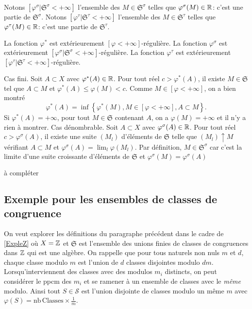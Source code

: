Notons $[\varphi^\sigma|\mathfrak{S}^{\sigma} < +\infty]$ l'ensemble des $M \in \mathfrak{S}^{\sigma}$ telles que $\varphi^\sigma(M) \in \mathbb{R}$: c'est une partie de $\mathfrak{S}^{\sigma}$.\newline
Notons $[\varphi^\tau|\mathfrak{S}^{\tau} < +\infty]$ l'ensemble des $M \in \mathfrak{S}^{\tau}$ telles que $\varphi^\tau(M) \in \mathbb{R}$: c'est une partie de $\mathfrak{S}^{\tau}$.
\begin{prop}
 La fonction $\varphi^*$ est extérieurement $[\varphi < +\infty]$-régulière.\newline
 La fonction $\varphi^\sigma$ est extérieurement $[\varphi^\sigma|\mathfrak{S}^{\sigma} < +\infty]$-régulière.\newline
 La fonction $\varphi^\tau$ est extérieurement $[\varphi^\tau|\mathfrak{S}^{\tau} < +\infty]$-régulière.
\end{prop}
\begin{demo}
 Cas fini.\newline
 Soit $A \subset X$ avec $\varphi^*(A) \in \mathbb{R}$. Pour tout réel $c > \varphi^*(A)$, il existe $M \in \mathfrak{S}$ tel que $A \subset M$ et $\varphi^*(A) \leq \varphi(M) < c$. Comme $M \in [\varphi < +\infty]$, on a bien montré
 \begin{displaymath}
  \varphi^*(A) = \inf\left\lbrace \varphi^*(M) , M \in [\varphi < +\infty], A \subset M \right\rbrace.
 \end{displaymath}
Si $\varphi^*(A)= +\infty$, pour tout $M\in \mathfrak{S}$ contenant $A$, on a $\varphi(M) = + \infty$ et il n'y a rien à montrer.\newline
Cas dénombrable.\newline
Soit $A \subset X$ avec $\varphi^\sigma(A) \in \mathbb{R}$. Pour tout réel $c > \varphi^\sigma(A)$, il existe une suite $(M_l)$ d'éléments de $\mathfrak{S}$ telle que  $(M_l)\uparrow M$  vérifiant  $A \subset M$ et $\varphi^\sigma(A) = \lim_l \varphi(M_l)$. Par définition, $M \in \mathfrak{S}^\sigma$ car c'est la limite d'une suite croissante d'éléments de $\mathfrak{S}$ et $\varphi^\sigma(M) = \varphi^\sigma(A)$

à compléter
\end{demo}

\subsection{Exemple pour les ensembles de classes de congruence}
On veut explorer les définitions du paragraphe précédent dans le cadre de \ref{ExpleZ} où $X= \mathbb{Z}$ et $\mathfrak{S}$ est l'ensemble des unions finies de classes de congruences dans $\mathbb{Z}$ qui est une algèbre.\newline
On rappelle que pour tous naturels non nuls $m$ et $d$, chaque classe modulo $m$ est l'union de $d$ classes disjointes modulo $dm$. Lorsqu'interviennent des classes avec des modulos $m_i$ distincts, on peut considérer le ppcm des $m_i$ et se ramener à un ensemble de classes avec le \emph{même} modulo. Ainsi tout $S\in \mathcal{S}$ est l'union disjointe de classes modulo un même $m$ avec $\varphi(S) = \mathrm{nb\, Classes}\times \frac{1}{m}$.

